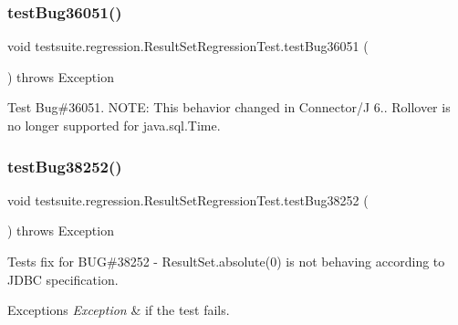 \subsubsection{\texorpdfstring{test\+Bug36051()}{testBug36051()}}
{\footnotesize\ttfamily void testsuite.\+regression.\+Result\+Set\+Regression\+Test.\+test\+Bug36051 (\begin{DoxyParamCaption}{ }\end{DoxyParamCaption}) throws Exception}

Test Bug\#36051. N\+O\+TE\+: This behavior changed in Connector/J 6.. Rollover is no longer supported for java.\+sql.\+Time. \mbox{\label{classtestsuite_1_1regression_1_1_result_set_regression_test_ae79fca0bd7d22ac046c30b0e69ae46e5}} 
\subsubsection{\texorpdfstring{test\+Bug38252()}{testBug38252()}}
{\footnotesize\ttfamily void testsuite.\+regression.\+Result\+Set\+Regression\+Test.\+test\+Bug38252 (\begin{DoxyParamCaption}{ }\end{DoxyParamCaption}) throws Exception}

Tests fix for B\+UG\#38252 -\/ Result\+Set.\+absolute(0) is not behaving according to J\+D\+BC specification.


\begin{DoxyExceptions}{Exceptions}
{\em Exception} & if the test fails. \\
\hline
\end{DoxyExceptions}
\mbox{\label{classtestsuite_1_1regression_1_1_result_set_regression_test_ac36269358f8d90ebeebaf8a8434ba03a}} 
